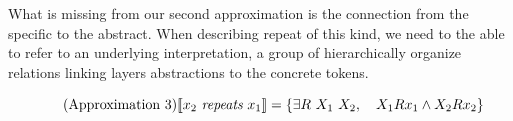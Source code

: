 What is missing from our second approximation is the connection from the specific to the abstract. When describing repeat of this kind, we need to the able to refer to an underlying interpretation, a group of hierarchically organize relations linking layers abstractions to the concrete tokens. 

\begin{equation} 
    \tag{Approximation 3}
    \llbracket x_2 \ \emph{repeats}\  x_1  \rrbracket = \left\{ \exists R\ X_1 \ X_2 ,\quad  X_1 R x_1 \wedge   X_2 R x_2 \right\}
\end{equation}





















